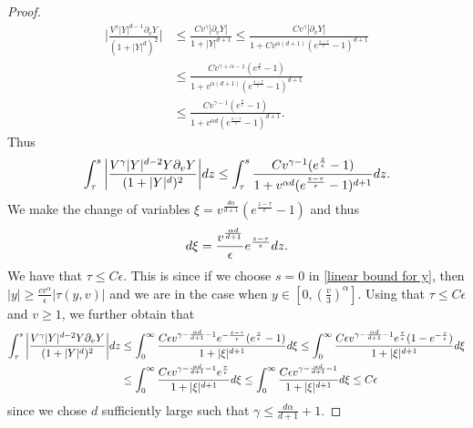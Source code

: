 \documentclass[10pt,a4paper]{amsart}
\newcommand{\der}{\textup{d}}
\begin{document}
\begin{proof}
\begin{align*}
 \bigg|\frac{V^{\gamma}|Y|^{d-1}\partial_{v}Y}{(1+|Y|^{d})^{2}}\bigg|&\leq  \frac{C  v^{\gamma}|\partial_{v}Y|}{1+|Y|^{d+1}}\leq  \frac{C  v^{\gamma}|\partial_{v}Y|}{1+C v^{\alpha (d+1)}(e^{\frac{s-\tau}{\epsilon}}-1)^{d+1}}\\
 &\leq \frac{C  v^{\gamma+\alpha-1}(e^{\frac{s}{\epsilon}}-1)}{1+v^{\alpha (d+1)}(e^{\frac{s-\tau}{\epsilon}}-1)^{d+1}}\\
 &\leq \frac{C  v^{\gamma-1} (e^{\frac{s}{\epsilon}}-1)}{1+ v^{\alpha d}(e^{\frac{s-\tau}{\epsilon}}-1)^{d+1}}.
\end{align*}
Thus
\begin{align*}
\int_{\tau}^{s} \bigg|\frac{V^{\gamma}|Y|^{d-2}Y\partial_{v}Y}{(1+|Y|^{d})^{2}}\bigg|\der z \leq \int_{\tau}^{s}\frac{C  v^{\gamma-1} (e^{\frac{z}{\epsilon}}-1)}{1+ v^{\alpha d}(e^{\frac{z-\tau}{\epsilon}}-1)^{d+1}}\der z.
\end{align*}
We make the change of variables $\xi=v^{\frac{d\alpha }{d+1}}(e^{\frac{z-\tau}{\epsilon}}-1)$ and thus
\begin{align*}
    \der \xi = \frac{v^{\frac{\alpha d}{d+1}}}{\epsilon}e^{\frac{z-\tau}{\epsilon}}\der z.
\end{align*}
We have that  $\tau\leq C\epsilon$. This is since if we choose $s=0$ in \eqref{linear bound for y}, then $|y|\geq \frac{c v^{\alpha}}{\epsilon}| \tau(y,v)|$ and we are in the case when $y\in[0, (\frac{v}{3})^{\alpha}]$. Using that $\tau\leq C\epsilon$ and $v\geq 1$, we further obtain that
\begin{align}\label{bound ii}
\int_{\tau}^{s} \bigg|\frac{V^{\gamma}|Y|^{d-2}Y\partial_{v}Y}{(1+|Y|^{d})^{2}}\bigg|\der z &\leq \int_{0}^{\infty}\frac{C \epsilon  v^{\gamma-\frac{\alpha d}{d+1}-1}e^{-\frac{z-\tau}{\epsilon}}(e^{\frac{z}{\epsilon}}-1) }{1+ |\xi|^{d+1}}\der \xi\leq \int_{0}^{\infty}\frac{C \epsilon  v^{\gamma-\frac{\alpha d}{d+1}-1}e^{\frac{\tau}{\epsilon}}(1-e^{-\frac{z}{\epsilon}}) }{1+ |\xi|^{d+1}}\der \xi\nonumber\\
&\leq \int_{0}^{\infty}\frac{C \epsilon  v^{\gamma-\frac{\alpha d}{d+1}-1}e^{\frac{\tau}{\epsilon}}}{1+ |\xi|^{d+1}}\der \xi\leq\int_{0}^{\infty}\frac{C \epsilon  v^{\gamma-\frac{\alpha d}{d+1}-1}}{1+ |\xi|^{d+1}}\der \xi\leq  C\epsilon
\end{align}
since we chose $d$ sufficiently large such that $\gamma\leq \frac{d\alpha}{d+1}+1$. 




\end{proof}
\end{document}
